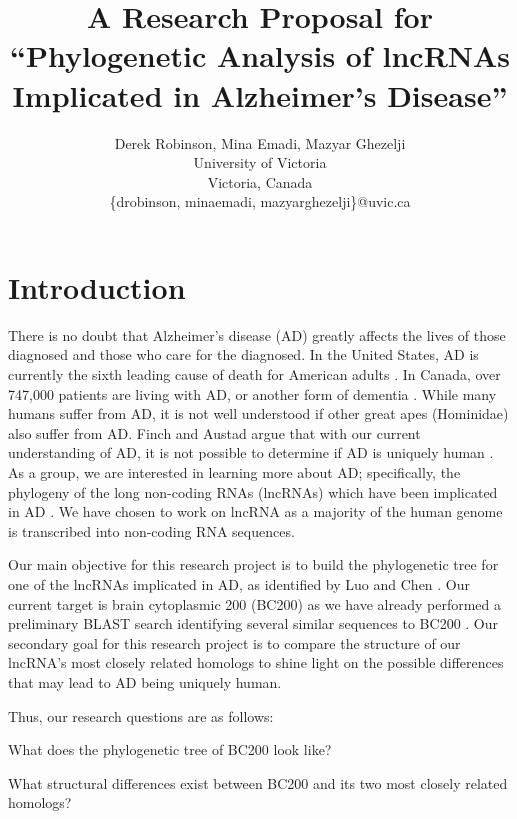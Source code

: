 \documentclass[conference]{IEEEtran}
\title{\vspace{-0.5cm}A Research Proposal for \\``Phylogenetic Analysis of lncRNAs Implicated in Alzheimer's Disease''}
\author{Derek Robinson, Mina Emadi, Mazyar Ghezelji\\
University of Victoria\\
Victoria, Canada \\
\{drobinson, minaemadi, mazyarghezelji\}@uvic.ca}
\begin{document}

\maketitle

\section{Introduction}\label{sec:intro}

There is no doubt that Alzheimer's disease (AD) greatly affects the lives of those diagnosed and those who care for the diagnosed. 
In the United States, AD is currently the sixth leading cause of death for American adults \cite{AlzheimersDisease}. 
In Canada, over 747,000 patients are living with AD, or another form of dementia \cite{ADcanada}. 
While many humans suffer from AD, it is not well understood if other great apes (Hominidae) also suffer from AD. 
Finch and Austad argue that with our current understanding of AD, it is not possible to determine if AD is uniquely human \cite{finch2015commentary}.
As a group, we are interested in learning more about AD; specifically, the phylogeny of the long non-coding RNAs (lncRNAs) which have been implicated in AD \cite{luo2016long}. 
We have chosen to work on lncRNA as a majority of the human genome is transcribed into non-coding RNA sequences.

Our main objective for this research project is to build the phylogenetic tree for one of the lncRNAs implicated in AD, as identified by Luo and Chen \cite{luo2016long}. 
Our current target is brain cytoplasmic 200 (BC200) as we have already performed a preliminary BLAST search identifying several similar sequences to BC200 \cite{madden2012blast,blastTool}. 
Our secondary goal for this research project is to compare the structure of our lncRNA's most closely related homologs to shine light on the possible differences that may lead to AD being uniquely human.

Thus, our research questions are as follows:

\begin{questions}
    \item What does the phylogenetic tree of BC200 look like?
    \item What structural differences exist between BC200 and its two most closely related homologs?
\end{questions}
\end{document}
